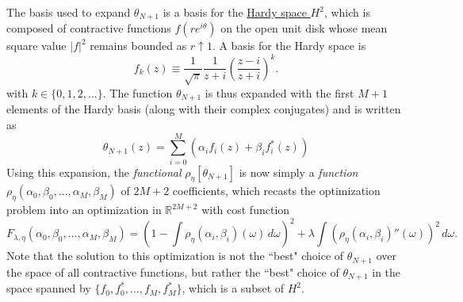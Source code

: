 The basis used to expand $\theta_{N+1}$ is a basis for the \href{https://en.wikipedia.org/wiki/Hardy_space#Martingale_Hp}{Hardy space $H^2$}, which is composed of contractive functions $f(re^{i\theta})$ on the open unit disk whose mean square value $|f|^2$ remains bounded as $r\uparrow 1$. A basis for the Hardy space is
\begin{equation}
    f_k(z) \equiv \frac{1}{\sqrt\pi} \frac{1}{z + i} \left( \frac{z - i}{z + i} \right)^k.
\end{equation}
with $k \in \{0, 1, 2, ...\}$. The function $\theta_{N + 1}$ is thus expanded with the first $M + 1$ elements of the Hardy basis (along with their complex conjugates) and is written as
\begin{equation}
    \theta_{N+1}(z) = \sum_{i = 0}^M \left( \alpha_i f_i(z) + \beta_i f_i^*(z) \right)
    \label{eq:hardy_basis_exp}
\end{equation}
Using this expansion, the \textit{functional} $\rho_\eta[\theta_{N+1}]$ is now simply a \textit{function} $\rho_\eta(\alpha_0, \beta_0, ..., \alpha_M, \beta_M)$ of $2M+2$ coefficients, which recasts the optimization problem into an optimization in $\mathbb R^{2M+2}$ with cost function
\begin{equation}
    F_{\lambda, \eta}(\alpha_0, \beta_0, ..., \alpha_M, \beta_M) =  \left( 1 - \int \rho_\eta(\alpha_i, \beta_i)(\omega)\,d\omega \right)^2 + \lambda \int \left( \rho_\eta(\alpha_i, \beta_i)''(\omega) \right)^2\,d\omega.
    \label{eq:optimization}
\end{equation}
Note that the solution to this optimization is not the ``best" choice of $\theta_{N+1}$ over the space of all contractive functions, but rather the ``best" choice of $\theta_{N+1}$ in the space spanned by $\{f_0, f_0^*, ..., f_M, f_M^*\}$, which is a subset of $H^2$. 



